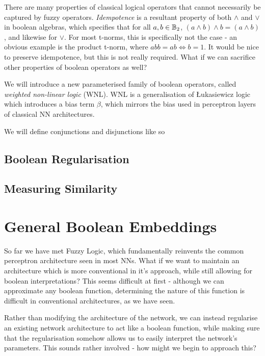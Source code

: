 There are many properties of classical logical operators that cannot necessarily be captured by fuzzy operators. \textit{Idempotence} is a resultant property of both $\land$ and $\lor$ in boolean algebras, which specifies that for all $a, b \in \mathbb{B}_2$, $(a \land b) \land b = (a \land b)$, and likewise for $\lor$. For most t-norms, this is specifically not the case - an obvious example is the product t-norm, where $abb=ab \iff b = 1$. It would be nice to preserve idempotence, but this is not really required. What if we can sacrifice other properties of boolean operators as well?

We will introduce a new parameterised family of boolean operators, called \textit{weighted non-linear logic} (WNL). WNL is a generalisation of Łukasiewicz logic which introduces a bias term $\beta$, which mirrors the bias used in perceptron layers of classical NN architectures. 

We will define conjunctions and disjunctions like so 



\subsection{Boolean Regularisation}

\subsection{Measuring Similarity}

\section{General Boolean Embeddings}

So far we have met Fuzzy Logic, which fundamentally reinvents the common perceptron architecture seen in most NNs. What if we want to maintain an architecture which is more conventional in it's approach, while still allowing for boolean interpretations? This seems difficult at first - although we can approximate any boolean function, determining the nature of this function is difficult in conventional architectures, as we have seen.

Rather than modifying the architecture of the network, we can instead regularise an existing network architecture to act like a boolean function, while making sure that the regularisation somehow allows us to easily interpret the network's parameters. This sounds rather involved - how might we begin to approach this?

